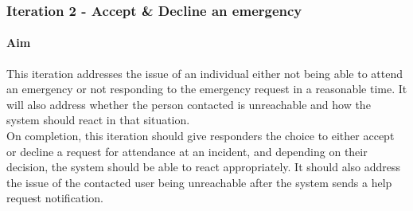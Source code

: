 \documentclass{article}
\begin{document}
\pagebreak
		\subsubsection{Iteration 2 - Accept \& Decline an emergency}
		\paragraph{Aim}
		This iteration addresses the issue of an individual either not being able to attend an emergency or not responding to the emergency request in a reasonable time. It will also address whether the person contacted is unreachable and how the system should react in that situation.\\
		
On completion, this iteration should give responders the choice to either accept or decline a request for attendance at an incident, and depending on their decision, the system should be able to react appropriately. It should also address the issue of the contacted user being unreachable after the system sends a help request notification.\\
\end{document}
